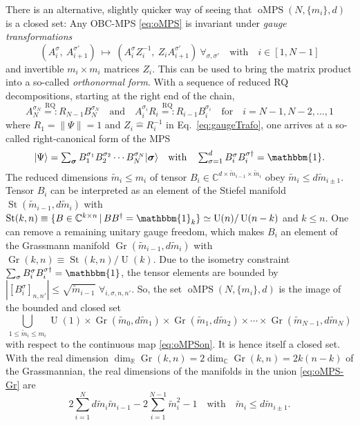 \documentclass[english,11pt,aps,pra,onecolumn,tightenlines,groupedaddress,superscriptaddress,notitlepage,floatfix,fleqn]{revtex4-1}
\newcommand{\id}{\mathbbm{1}}
\newcommand{\ket}{\rangle}
\renewcommand{\vec}[1]{{\boldsymbol{#1}}}
\newcommand{\s}{\sigma}
\newcommand{\vs}{\vec{\sigma}}
\newcommand{\RR}{\mathbb{R}}
\newcommand{\CC}{\mathbb{C}}
\newcommand{\oMPS}{\operatorname{oMPS}}
\newcommand{\Gr}{\operatorname{Gr}}
\newcommand{\St}{\operatorname{St}}
\newcommand{\U}{\operatorname{U}}
\newcommand{\RQ}{\text{RQ}}
\begin{document}
There is an alternative, slightly quicker way of seeing that $\oMPS(N,\{m_i\},d)$ is a closed set: Any OBC-MPS \eqref{eq:oMPS} is invariant under \emph{gauge transformations}
\begin{equation}\label{eq:gaugeTrafo}
	\left(A_i^\s, \ A_{i+1}^{\s'}\right) \ \mapsto \ \left(A_i^\s Z^{-1}_i, \ Z_i A_{i+1}^{\s'}\right) \ \forall_{\s,\s'} \quad\text{with} \quad i\in[1,N-1]
\end{equation}
and invertible $m_i\times m_i$ matrices $Z_i$. This can be used to bring the matrix product into a so-called \emph{orthonormal form}. With a sequence of reduced RQ decompositions, starting at the right end of the chain,
\begin{equation}\label{eq:oMPS_RQ}
	A_N^{\s_N}\stackrel{\RQ}{=:}R_{N-1} B_N^{\s_N} \quad\text{and}\quad
	A_{i}^{\s_{i}}R_{i}\stackrel{\RQ}{=:}R_{i-1} B_{i}^{\s_{i}}
	\quad\text{for}\quad
	i=N-1,N-2,\dotsc,1
\end{equation}
where $R_{1}=\|\Psi\|=1$ and $Z_i\hat{=}R_i^{-1}$ in Eq.~\eqref{eq:gaugeTrafo}, one arrives at a so-called right-canonical form of the MPS
\begin{equation}\label{eq:oMPSon}\textstyle
	|\Psi\ket=\sum_\vs B_1^{\s_1}B_2^{\s_2}\dotsb B_N^{\s_N}|\vs\ket \quad\text{with}\quad
	\sum_{\s=1}^{d} B_i^\s B_i^{\s\dag}=\id.
\end{equation}
The reduced dimensions $\tilde{m}_i\leq m_i$ of tensor $B_i\in \CC^{d\times \tilde{m}_{i-1}\times \tilde{m}_{i}}$ obey $\tilde{m}_i\leq d \tilde{m}_{i\pm 1}$.
Tensor $B_i$ can be interpreted as an element of the Stiefel manifold $\St(\tilde{m}_{i-1},d \tilde{m}_i)$ with $\St(k,n)\equiv\{B\in \CC^{k\times n}\,|\,BB^\dag=\id_k\}\simeq\U(n)/\U(n-k)$ and $k\leq n$. One can remove a remaining unitary gauge freedom, which makes $B_i$ an element of the Grassmann manifold $\Gr(\tilde{m}_{i-1},d \tilde{m}_i)$ with $\Gr(k,n)\equiv\St(k,n)/\U(k)$. Due to the isometry constraint $\sum_{\s} B_i^\s B_i^{\s\dag}=\id$, the tensor elements are bounded by $\left|[B^\s_i]_{n,n'}\right|\leq \sqrt{\tilde{m}_{i-1}}$ $\forall_{i,\s,n,n'}$. So, the set $\oMPS(N,\{m_i\},d)$ is the image of the bounded and closed set
\begin{equation}\label{eq:oMPS-Gr}\textstyle
	\bigcup_{1\leq\tilde{m}_i\leq m_i} \U(1)\times\Gr(\tilde{m}_0,d \tilde{m}_1)\times \Gr(\tilde{m}_1,d \tilde{m}_2) \times \dotsb\times \Gr(\tilde{m}_{N-1},d \tilde{m}_N)
\end{equation}
with respect to the continuous map \eqref{eq:oMPSon}. It is hence itself a closed set. With the real dimension $\dim_\RR \Gr(k,n)=2\dim_\CC \Gr(k,n)=2k(n-k)$ of the Grassmannian, the real dimensions of the manifolds in the union \eqref{eq:oMPS-Gr} are
\begin{equation}\textstyle
	 2\sum_{i=1}^{N} d \tilde{m}_i \tilde{m}_{i-1} - 2\sum_{i=1}^{N-1} \tilde{m}_i^2 - 1\quad
	\text{with}\quad \tilde{m}_i\leq d \tilde{m}_{i\pm 1}.
\end{equation}
\end{document}
